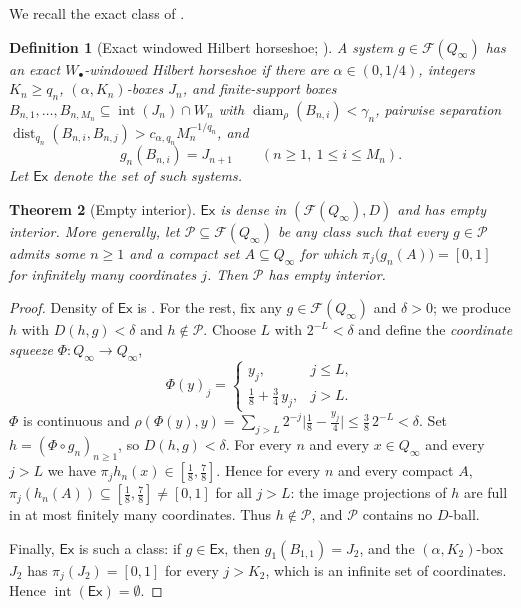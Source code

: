 \documentclass[11pt]{article}
\newtheorem{theorem}{Theorem}[section]
\newtheorem{definition}[theorem]{Definition}
\newcommand{\Q}{Q_\infty}
\newcommand{\F}{\mathcal{F}}
\newcommand{\dist}{\operatorname{dist}}
\newcommand{\diam}{\operatorname{diam}}
\newcommand{\EX}{\mathsf{Ex}}
\begin{document}
We recall the exact class of \cite{Shmalo2026}.

\begin{definition}[{Exact windowed Hilbert horseshoe; \cite[Definition~12.1]{Shmalo2026}}]\label{def:exact}
A system $g\in\F(\Q)$ has an exact $W_\bullet$-windowed Hilbert horseshoe if there are
$\alpha\in(0,1/4)$, integers $K_n\ge q_n$, $(\alpha,K_n)$-boxes $J_n$, and
finite-support boxes $B_{n,1},\dots,B_{n,M_n}\subseteq\operatorname{int}(J_n)\cap W_n$
with $\diam_\rho(B_{n,i})<\gamma_n$, pairwise separation
$\dist_{q_n}(B_{n,i},B_{n,j})>c_{\alpha,q_n}M_n^{-1/q_n}$, and
\[
g_n(B_{n,i})=J_{n+1}\qquad(n\ge1,\ 1\le i\le M_n).
\]
Let $\EX$ denote the set of such systems.
\end{definition}

\begin{theorem}[Empty interior]\label{thm:empty}
$\EX$ is dense in $(\F(\Q),D)$ and has empty interior.  More generally, let
$\mathcal P\subseteq\F(\Q)$ be any class such that every $g\in\mathcal P$ admits some
$n\ge1$ and a compact set $A\subseteq\Q$ for which
$\pi_j\bigl(g_n(A)\bigr)=[0,1]$ for infinitely many coordinates $j$.  Then
$\mathcal P$ has empty interior.
\end{theorem}

\begin{proof}
Density of $\EX$ is \cite[Proposition~12.2]{Shmalo2026}.  For the rest, fix any
$g\in\F(\Q)$ and $\delta>0$; we produce $h$ with $D(h,g)<\delta$ and
$h\notin\mathcal P$.  Choose $L$ with $2^{-L}<\delta$ and define the
\emph{coordinate squeeze} $\Phi:\Q\to\Q$,
\[
\Phi(y)_j=
\begin{cases}
y_j, & j\le L,\\
\tfrac18+\tfrac34\,y_j, & j>L .
\end{cases}
\]
$\Phi$ is continuous and
$\rho(\Phi(y),y)=\sum_{j>L}2^{-j}\bigl|\tfrac18-\tfrac{y_j}{4}\bigr|
\le\tfrac38\,2^{-L}<\delta$.
Set $h=(\Phi\circ g_n)_{n\ge1}$, so $D(h,g)<\delta$.  For every $n$ and every
$x\in\Q$ and every $j>L$ we have $\pi_j h_n(x)\in[\tfrac18,\tfrac78]$.  Hence for
every $n$ and every compact $A$, $\pi_j(h_n(A))\subseteq[\tfrac18,\tfrac78]\ne[0,1]$
for all $j>L$: the image projections of $h$ are full in at most finitely many
coordinates.  Thus $h\notin\mathcal P$, and $\mathcal P$ contains no $D$-ball.

Finally, $\EX$ is such a class: if $g\in\EX$, then
$g_1(B_{1,1})=J_2$, and the $(\alpha,K_2)$-box $J_2$ has
$\pi_j(J_2)=[0,1]$ for every $j>K_2$, which is an infinite set of coordinates.
Hence $\operatorname{int}(\EX)=\emptyset$.
\end{proof}
\end{document}
